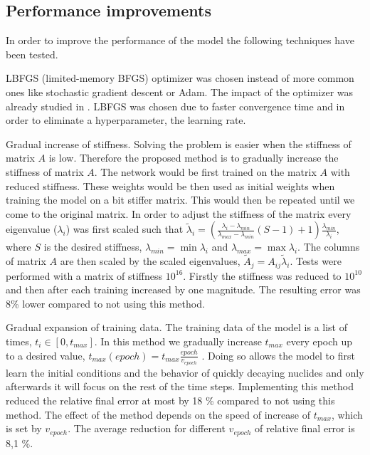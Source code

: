 \documentclass[10pt]{article}
\begin{document}
\subsection{Performance improvements}
In order to improve the performance of the model the following techniques have been tested.

LBFGS (limited-memory BFGS) optimizer was chosen instead of more common ones like stochastic gradient descent or Adam. The impact of the optimizer was already studied in \cite{cit:gugli}. LBFGS was chosen due to faster convergence time and in order to eliminate a hyperparameter, the learning rate.

Gradual increase of stiffness. Solving the problem is easier when the stiffness of matrix $A$ is low. Therefore the proposed method is to gradually increase the stiffness of matrix $A$. The network would be first trained on the matrix $A$ with reduced stiffness. These weights would be then used as initial weights when training the model on a bit stiffer matrix. This would then be repeated until we come to the original matrix. In order to adjust the stiffness of the matrix every eigenvalue ($\lambda_i$) was first scaled such that $\tilde{\lambda}_i = \left(\frac{\lambda_i - \lambda_{min}}{\lambda_{max}-\lambda_{min}}(S-1)+1\right)\frac{\lambda_{min}}{\lambda_i}$, where $S$ is the desired stiffness, $\lambda_{min} = \min \lambda_i$ and $\lambda_{max} = \max \lambda_i$. The columns of matrix $A$ are then scaled by the scaled eigenvalues, $\tilde{A}_{j} = A_{ij} \tilde{\lambda}_i$. Tests were performed with a matrix of stiffness $10^{16}$. Firstly the stiffness was reduced to $10^{10}$ and then after each training increased by one magnitude. The resulting error was 8\% lower compared to not using this method.

Gradual expansion of training data. The training data of the model is a list of times, $t_i\in[0, t_{max}]$. In this method we gradually increase $t_{max}$ every epoch up to a desired value, $t_{max}(epoch) = t_{max} \frac{epoch}{v_{epoch}}$ \cite{cit:increase_tmax}. Doing so allows the model to first learn the initial conditions and the behavior of quickly decaying nuclides and only afterwards it will focus on the rest of the time steps. Implementing this method reduced the relative final error at most by 18 \% compared to not using this method. The effect of the method depends on the speed of increase of $t_{max}$, which is set by $v_{epoch}$. The average reduction for different $v_{epoch}$ of relative final error is 8,1 \%. 
\end{document}

